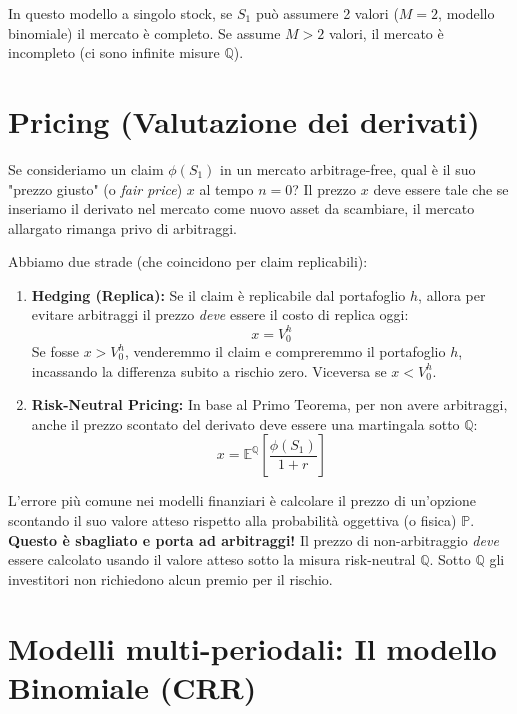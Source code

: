 \documentclass[11pt, a4paper]{report}
\theoremstyle{plain}
\theoremstyle{definition}
\theoremstyle{remark}
\newcommand{\PP}{\mathbb{P}}
\newcommand{\E}{\mathbb{E}}
\newcommand{\QQ}{\mathbb{Q}}
\newcommand{\1}{\mathbf{1}}
\begin{document}
In questo modello a singolo stock, se $S_1$ può assumere 2 valori ($M=2$, modello binomiale) il mercato è completo. Se assume $M > 2$ valori, il mercato è incompleto (ci sono infinite misure $\QQ$).

\section{Pricing (Valutazione dei derivati)}

Se consideriamo un claim $\phi(S_1)$ in un mercato arbitrage-free, qual è il suo "prezzo giusto" (o \textit{fair price}) $x$ al tempo $n=0$?
Il prezzo $x$ deve essere tale che se inseriamo il derivato nel mercato come nuovo asset da scambiare, il mercato allargato rimanga privo di arbitraggi.

Abbiamo due strade (che coincidono per claim replicabili):
\begin{enumerate}
    \item \textbf{Hedging (Replica):} Se il claim è replicabile dal portafoglio $h$, allora per evitare arbitraggi il prezzo \emph{deve} essere il costo di replica oggi:
    \[ x = V_0^h \]
    Se fosse $x > V_0^h$, venderemmo il claim e compreremmo il portafoglio $h$, incassando la differenza subito a rischio zero. Viceversa se $x < V_0^h$.
    \item \textbf{Risk-Neutral Pricing:} In base al Primo Teorema, per non avere arbitraggi, anche il prezzo scontato del derivato deve essere una martingala sotto $\QQ$:
    \[ x = \E^\QQ\left[ \frac{\phi(S_1)}{1+r} \right] \]
\end{enumerate}

\begin{tcolorbox}[colback=red!5!white,colframe=red!75!black,title=Attenzione: Pricing sotto $\PP$ vs $\QQ$]
L'errore più comune nei modelli finanziari è calcolare il prezzo di un'opzione scontando il suo valore atteso rispetto alla probabilità oggettiva (o fisica) $\PP$. \textbf{Questo è sbagliato e porta ad arbitraggi!} Il prezzo di non-arbitraggio \emph{deve} essere calcolato usando il valore atteso sotto la misura risk-neutral $\QQ$. Sotto $\QQ$ gli investitori non richiedono alcun premio per il rischio.
\end{tcolorbox}

\section{Modelli multi-periodali: Il modello Binomiale (CRR)}
\end{document}
